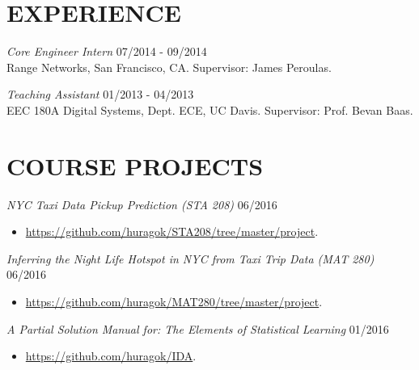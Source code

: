 \documentclass[margin]{res} %
\begin{document}
\begin{resume}
    
     
        \section{EXPERIENCE}
        
        {\sl Core Engineer Intern} \hfill 07/2014 - 09/2014 \\
        Range Networks, San Francisco, CA. Supervisor: James Peroulas.
        
        {\sl Teaching Assistant} \hfill 01/2013 - 04/2013 \\
        EEC 180A Digital Systems, Dept. ECE, UC Davis. Supervisor: Prof. Bevan
        Baas.
        
        
        
        \section{COURSE PROJECTS}
        {\sl NYC Taxi Data Pickup Prediction (STA 208)} \hfill 06/2016
        \begin{itemize} 
          \item \url{https://github.com/huragok/STA208/tree/master/project}.
        \end{itemize}
        
        {\sl Inferring the Night Life Hotspot in NYC from Taxi Trip Data (MAT
        280)} \hfill 06/2016
        \begin{itemize}
          \item \url{https://github.com/huragok/MAT280/tree/master/project}.
        \end{itemize}
        
        {\sl A Partial Solution Manual for: The Elements of Statistical Learning
        } \hfill 01/2016
        \begin{itemize} 
            \item \url{https://github.com/huragok/IDA}.
        \end{itemize}
        

\end{resume}
\end{document}
